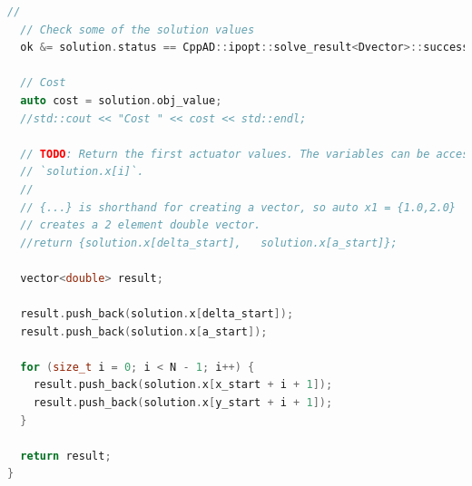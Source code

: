 \documentclass[11pt]{article}
\begin{document}
\begin{lstlisting}[language=C++, caption={MPC solver with ipopt}]
  //
  // Check some of the solution values
  ok &= solution.status == CppAD::ipopt::solve_result<Dvector>::success;

  // Cost
  auto cost = solution.obj_value;
  //std::cout << "Cost " << cost << std::endl;

  // TODO: Return the first actuator values. The variables can be accessed with
  // `solution.x[i]`.
  //
  // {...} is shorthand for creating a vector, so auto x1 = {1.0,2.0}
  // creates a 2 element double vector.
  //return {solution.x[delta_start],   solution.x[a_start]};

  vector<double> result;

  result.push_back(solution.x[delta_start]);
  result.push_back(solution.x[a_start]);

  for (size_t i = 0; i < N - 1; i++) {
    result.push_back(solution.x[x_start + i + 1]);
    result.push_back(solution.x[y_start + i + 1]);
  }

  return result;
}
\end{lstlisting}
\end{document}
